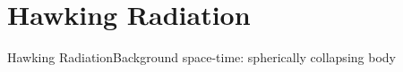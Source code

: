 \documentclass{beamer}
\begin{document}

\section{Hawking Radiation}

\begin{frame}{Hawking Radiation}{Background space-time: spherically collapsing 
body}
\begin{center}

\end{center}
\end{frame}
\end{document}
